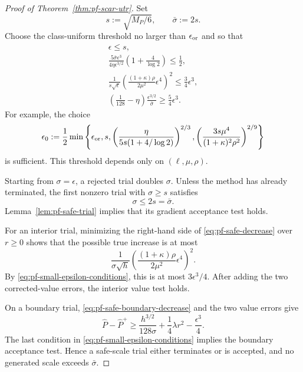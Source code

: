 \begin{proof}[Proof of Theorem~\ref{thm:pf-scar-utr}]
Set
\[
    s:=\sqrt{M_P/6},
    \qquad
    \bar\sigma:=2s.
\]
Choose the class-uniform threshold no larger than
$\epsilon_{\rm or}$ and so that
\begin{equation}
\begin{gathered}
    \epsilon\le s,
    \\
    \frac{
        5\bar\sigma\epsilon^3
    }{
        4\eta\epsilon^{3/2}
    }
    \left(
        1+\frac4{\log2}
    \right)
    \le
    \frac12,
    \\
    \frac1{s\sqrt\epsilon}
    \left(
        \frac{(1+\kappa)\rho}{2\mu^2}
        \epsilon^4
    \right)^2
    \le
    \frac34\epsilon^3,
    \\
    \left(
        \frac1{128}-\eta
    \right)
    \frac{\epsilon^{3/2}}{\bar\sigma}
    \ge
    \frac54\epsilon^3.
\end{gathered}
\label{eq:pf-small-epsilon-conditions}
\end{equation}
For example, the choice
\begin{equation}
    \epsilon_0
    :=
    \frac12
    \min\left\{
        \epsilon_{\rm or},
        s,
        \left(
            \frac{
                \eta
            }{
                5s(1+4/\log2)
            }
        \right)^{2/3},
        \left(
            \frac{
                3s\mu^4
            }{
                (1+\kappa)^2\rho^2
            }
        \right)^{2/9}
    \right\}
    \label{eq:pf-class-uniform-onset}
\end{equation}
is sufficient.
This threshold depends only on $(\ell,\mu,\rho)$.

Starting from $\sigma=\epsilon$, a rejected trial doubles $\sigma$.
Unless the method has already terminated, the first nonzero trial
with $\sigma\ge s$ satisfies
\[
    \sigma\le2s=\bar\sigma.
\]
Lemma~\ref{lem:pf-safe-trial} implies that its gradient acceptance
test holds.

For an interior trial, minimizing the right-hand side of
\eqref{eq:pf-safe-decrease} over $r\ge0$ shows that the possible true
increase is at most
\[
    \frac1{\sigma\sqrt h}
    \left(
        \frac{(1+\kappa)\rho}{2\mu^2}
        \epsilon^4
    \right)^2.
\]
By \eqref{eq:pf-small-epsilon-conditions}, this is at most
$3\epsilon^3/4$. After adding the two corrected-value errors, the
interior value test holds.

On a boundary trial,
\eqref{eq:pf-safe-boundary-decrease} and the two value errors give
\[
    \widehat P-\widehat P^+
    \ge
    \frac{h^{3/2}}{128\sigma}
    +
    \frac14\lambda r^2
    -
    \frac{\epsilon^3}{4}.
\]
The last condition in
\eqref{eq:pf-small-epsilon-conditions} implies the boundary
acceptance test.
Hence a safe-scale trial either terminates or is accepted, and no
generated scale exceeds $\bar\sigma$.


\end{proof}
